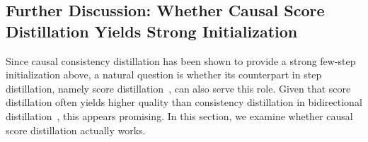 

\subsection{Further Discussion: Whether Causal Score Distillation Yields Strong Initialization}

\label{sec: causal dmd}

Since causal consistency distillation has been shown to provide a strong few-step initialization above, a natural question is whether its counterpart in step distillation, namely score distillation~\cite{wang2023prolificdreamer,luo2023diff,yin2024one}, can also serve this role. Given that score distillation often yields higher quality than consistency distillation in bidirectional distillation~\cite{yin2024one,yin2024improved,zheng2025large}, this appears promising. In this section, we examine whether causal score distillation actually works.




